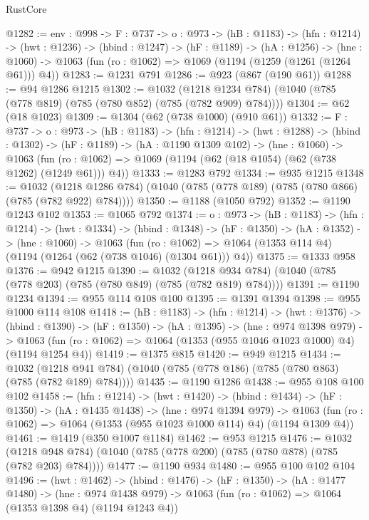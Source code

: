 \begin{lexlean}{RustCore}
\begin{coremodule}
@1282 := {env : @998} ->
  {F : @737} ->
  {o : @973} ->
  (hB : @1183) ->
  (hfn : @1214) ->
  (hwt : @1236) ->
  (hbind : @1247) ->
  (hF : @1189) ->
  (hA : @1256) ->
  (hne : @1060) -> @1063 (fun (ro : @1062) => @1069 (@1194 (@1259 (@1261 (@1264 @61))) @4))
@1283 := @1231 @791
@1286 := @923 (@867 (@190 @61))
@1288 := @94 @1286 @1215
@1302 := @1032
    (@1218 @1234 @784)
    (@1040 (@785 (@778 @819) (@785 (@780 @852) (@785 (@782 @909) @784))))
@1304 := @62 (@18 @1023)
@1309 := @1304 (@62 (@738 @1000) (@910 @61))
@1332 := {F : @737} ->
  {o : @973} ->
  (hB : @1183) ->
  (hfn : @1214) ->
  (hwt : @1288) ->
  (hbind : @1302) ->
  (hF : @1189) ->
  (hA : @1190 @1309 @102) ->
  (hne : @1060) ->
  @1063 (fun (ro : @1062) => @1069 (@1194 (@62 (@18 @1054) (@62 (@738 @1262) (@1249 @61))) @4))
@1333 := @1283 @792
@1334 := @935 @1215
@1348 := @1032
    (@1218 @1286 @784)
    (@1040 (@785 (@778 @189) (@785 (@780 @866) (@785 (@782 @922) @784))))
@1350 := @1188 (@1050 @792)
@1352 := @1190 @1243 @102
@1353 := @1065 @792
@1374 := {o : @973} ->
  (hB : @1183) ->
  (hfn : @1214) ->
  (hwt : @1334) ->
  (hbind : @1348) ->
  (hF : @1350) ->
  (hA : @1352) ->
  (hne : @1060) ->
  @1063
    (fun (ro : @1062) => @1064 (@1353 @114 @4) (@1194 (@1264 (@62 (@738 @1046) (@1304 @61))) @4))
@1375 := @1333 @958
@1376 := @942 @1215
@1390 := @1032
    (@1218 @934 @784)
    (@1040 (@785 (@778 @203) (@785 (@780 @849) (@785 (@782 @819) @784))))
@1391 := @1190 @1234
@1394 := @955 @114 @108 @100
@1395 := @1391 @1394
@1398 := @955 @1000 @114 @108
@1418 := (hB : @1183) ->
  (hfn : @1214) ->
  (hwt : @1376) ->
  (hbind : @1390) ->
  (hF : @1350) ->
  (hA : @1395) ->
  (hne : @974 @1398 @979) ->
  @1063 (fun (ro : @1062) => @1064 (@1353 (@955 @1046 @1023 @1000) @4) (@1194 @1254 @4))
@1419 := @1375 @815
@1420 := @949 @1215
@1434 := @1032
    (@1218 @941 @784)
    (@1040 (@785 (@778 @186) (@785 (@780 @863) (@785 (@782 @189) @784))))
@1435 := @1190 @1286
@1438 := @955 @108 @100 @102
@1458 := (hfn : @1214) ->
  (hwt : @1420) ->
  (hbind : @1434) ->
  (hF : @1350) ->
  (hA : @1435 @1438) ->
  (hne : @974 @1394 @979) ->
  @1063 (fun (ro : @1062) => @1064 (@1353 (@955 @1023 @1000 @114) @4) (@1194 @1309 @4))
@1461 := @1419 (@350 @1007 @1184)
@1462 := @953 @1215
@1476 := @1032
    (@1218 @948 @784)
    (@1040 (@785 (@778 @200) (@785 (@780 @878) (@785 (@782 @203) @784))))
@1477 := @1190 @934
@1480 := @955 @100 @102 @104
@1496 := (hwt : @1462) ->
  (hbind : @1476) ->
  (hF : @1350) ->
  (hA : @1477 @1480) ->
  (hne : @974 @1438 @979) -> @1063 (fun (ro : @1062) => @1064 (@1353 @1398 @4) (@1194 @1243 @4))

\end{coremodule}
\end{lexlean}
